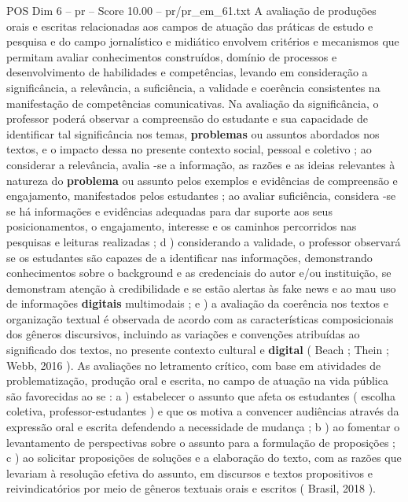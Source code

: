 \begin{textsample}{POS Dim 6 – pr – Score 10.00 – pr/pr\_em\_61.txt}
A avaliação de produções orais e escritas relacionadas aos campos de atuação das práticas de estudo e pesquisa e do campo jornalístico e midiático envolvem critérios e mecanismos que permitam avaliar conhecimentos construídos, domínio de processos e desenvolvimento de habilidades e competências, levando em consideração a significância, a relevância, a suficiência, a validade e coerência consistentes na manifestação de competências comunicativas.
Na avaliação da significância, o professor poderá observar a compreensão do estudante e sua capacidade de identificar tal significância nos temas, \textbf{problemas} ou assuntos abordados nos textos, e o impacto dessa no presente contexto social, pessoal e coletivo ; ao considerar a relevância, avalia -se a informação, as razões e as ideias relevantes à natureza do \textbf{problema} ou assunto pelos exemplos e evidências de compreensão e engajamento, manifestados pelos estudantes ; ao avaliar suficiência, considera -se se há informações e evidências adequadas para dar suporte aos seus posicionamentos, o engajamento, interesse e os caminhos percorridos nas pesquisas e leituras realizadas ; d ) considerando a validade, o professor observará se os estudantes são capazes de a identificar nas informações, demonstrando conhecimentos sobre o background e as credenciais do autor e/ou instituição, se demonstram atenção à credibilidade e se estão alertas às fake news e ao mau uso de informações \textbf{digitais} multimodais ; e ) a avaliação da coerência nos textos e organização textual é observada de acordo com as características composicionais dos gêneros discursivos, incluindo as variações e convenções atribuídas ao significado dos textos, no presente contexto cultural e \textbf{digital} ( Beach ; Thein ; Webb, 2016 ).
As avaliações no letramento crítico, com base em atividades de problematização, produção oral e escrita, no campo de atuação na vida pública são favorecidas ao se : a ) estabelecer o assunto que afeta os estudantes ( escolha coletiva, professor-estudantes ) e que os motiva a convencer audiências através da expressão oral e escrita defendendo a necessidade de mudança ; b ) ao fomentar o levantamento de perspectivas sobre o assunto para a formulação de proposições ; c ) ao solicitar proposições de soluções e a elaboração do texto, com as razões que levariam à resolução efetiva do assunto, em discursos e textos propositivos e reivindicatórios por meio de gêneros textuais orais e escritos ( Brasil, 2018 ).

\end{textsample}
